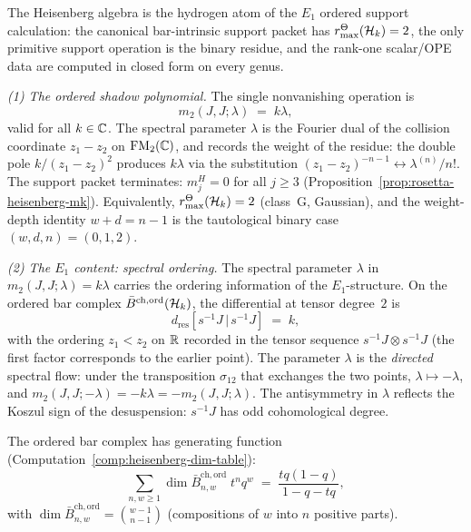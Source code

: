 \begin{computation}%
\label{comp:heisenberg-e1-ordered-shadow}%
%
%
%
The Heisenberg algebra is the hydrogen atom of the $E_1$ ordered
support calculation: the canonical bar-intrinsic support packet has
$r^\Theta_{\max}(\mathcal{H}_k)=2$, the only primitive support operation is the
binary residue, and the rank-one scalar/OPE data are computed in
closed form on every genus.

\smallskip
\noindent
\emph{(1) The ordered shadow polynomial.}
The single nonvanishing operation is
\begin{equation}\label{eq:e1-shadow-m2}
m_2(J,J;\lambda) \;=\; k\lambda,
\end{equation}
valid for all $k \in \mathbb{C}$. The spectral parameter $\lambda$ is the
Fourier dual of the collision coordinate $z_1 - z_2$ on
$\mathrm{FM}_2(\mathbb{C})$, and records the weight of the residue: the double pole
$k/(z_1 - z_2)^2$ produces $k\lambda$ via the substitution
$(z_1 - z_2)^{-n-1} \leftrightarrow \lambda^{(n)}/n!$. The support
packet terminates: $m^H_j = 0$ for all $j \ge 3$
(Proposition~\ref{prop:rosetta-heisenberg-mk}). Equivalently,
$r^\Theta_{\max}(\mathcal{H}_k)=2$ (class~G, Gaussian), and the
weight-depth identity $w+d=n-1$ is the tautological binary case
$(w,d,n)=(0,1,2)$.

\smallskip
\noindent
\emph{(2) The $E_1$ content: spectral ordering.}
The spectral parameter $\lambda$ in $m_2(J,J;\lambda) = k\lambda$
carries the ordering information of the $E_1$-structure. On the
ordered bar complex $\bar{B}^{\mathrm{ch,ord}}(\mathcal{H}_k)$, the
differential at tensor degree~$2$ is
\[
d_{\mathrm{res}}[s^{-1}J \,|\, s^{-1}J]
\;=\; k,
\]
with the ordering $z_1 < z_2$ on $\mathbb{R}$ recorded in the tensor
sequence $s^{-1}J \otimes s^{-1}J$ (the first factor corresponds to
the earlier point). The parameter $\lambda$ is the \emph{directed}
spectral flow: under the transposition $\sigma_{12}$ that exchanges
the two points, $\lambda \mapsto -\lambda$, and
$m_2(J,J;-\lambda) = -k\lambda = -m_2(J,J;\lambda)$. The
antisymmetry in $\lambda$ reflects the Koszul sign of the
desuspension: $s^{-1}J$ has odd cohomological degree.

The ordered bar complex has generating function
(Computation~\ref{comp:heisenberg-dim-table}):
\[
\sum_{n,w \ge 1}
\dim\bar{B}^{\mathrm{ch,ord}}_{n,w}\; t^n q^w
\;=\;
\frac{tq(1-q)}{1-q-tq},
\]
with $\dim\bar{B}^{\mathrm{ch,ord}}_{n,w} = \binom{w-1}{n-1}$
(compositions of $w$ into $n$ positive parts).


\end{computation}
